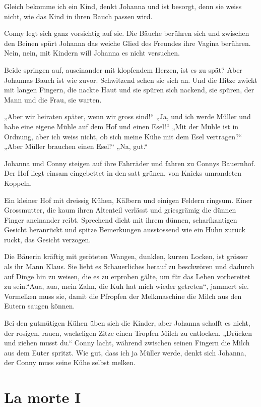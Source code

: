 \documentclass[10pt,titlepage,a5paper]{book}
\begin{document}
Gleich bekomme ich ein Kind, denkt Johanna und ist besorgt, denn sie weiss nicht, wie das Kind in ihren Bauch passen wird.

Conny legt sich ganz vorsichtig auf sie. Die Bäuche berühren sich und zwischen den Beinen spürt Johanna das weiche Glied des Freundes ihre Vagina berühren. Nein, nein, mit Kindern will Johanna es nicht versuchen.

Beide springen auf, auseinander mit klopfendem Herzen, ist es zu spät? Aber Johannas Bauch ist wie zuvor. Schwitzend sehen sie sich an. Und die Hitze zwickt mit langen Fingern, die nackte Haut und sie spüren sich nackend, sie spüren, der Mann und die Frau, sie warten.

„Aber wir heiraten später, wenn wir gross sind!“ „Ja, und ich werde Müller und habe eine eigene Mühle auf dem Hof und einen Esel!“ „Mit der Mühle ist in Ordnung, aber ich weiss nicht, ob sich meine Kühe mit dem Esel vertragen?“ „Aber Müller brauchen einen Esel!“ „Na, gut.“

Johanna und Conny steigen auf ihre Fahrräder und fahren zu Connys Bauernhof. Der Hof liegt einsam eingebettet in den satt grünen, von Knicks umrandeten Koppeln.

Ein kleiner Hof mit dreissig Kühen, Kälbern und einigen Feldern ringsum. Einer Grossmutter, die kaum ihren Altenteil verlässt und griesgrämig die dünnen Finger aneinander  reibt. Sprechend dicht mit ihrem dünnen, scharfkantigen Gesicht heranrückt und spitze Bemerkungen ausstossend wie ein Huhn zurück ruckt, das Gesicht verzogen.

Die Bäuerin kräftig mit geröteten Wangen, dunklen, kurzen Locken, ist grösser als ihr Mann Klaus. Sie liebt es Schauerliches herauf zu beschwören und dadurch auf Dinge hin zu weisen, die es zu erproben gälte, um für das Leben vorbereitet zu sein.“Aua, aua, mein Zahn, die Kuh hat mich wieder getreten“, jammert sie. Vormelken muss sie, damit die Pfropfen der Melkmaschine die Milch aus den Eutern saugen können.

Bei den gutmütigen Kühen üben sich die Kinder, aber Johanna schafft es nicht, der rosigen, rauen, wackeligen Zitze einen Tropfen Milch zu entlocken. „Drücken und ziehen musst du.“ Conny lacht, während zwischen seinen Fingern die Milch aus dem Euter spritzt. Wie gut, dass ich ja Müller werde, denkt sich Johanna, der Conny muss seine Kühe selbst melken.


\section*{La morte I}
\end{document}
